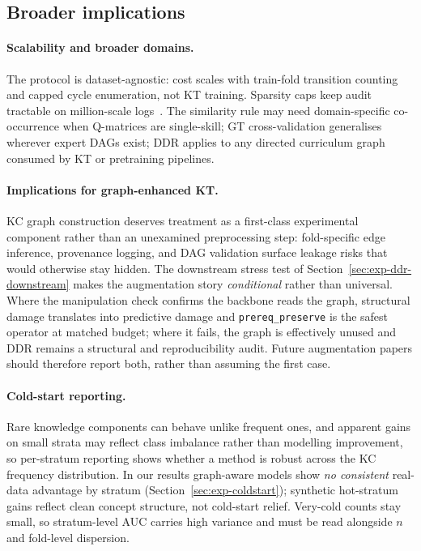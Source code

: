 \documentclass[preprint,10pt,doubleblind]{elsarticle}
\newcommand{\KCs}{knowledge components}
\newcommand{\DDR}{\textsc{DDR}}
\begin{document}
\subsection{Broader implications}
\label{sec:disc-implications}

\paragraph{Scalability and broader domains.}
The protocol is dataset-agnostic: cost scales with train-fold transition
counting and capped cycle enumeration, not KT training. Sparsity caps keep
audit tractable on million-scale logs~\cite{choi2020ednet}. The similarity
rule may need domain-specific co-occurrence when Q-matrices are single-skill;
GT cross-validation generalises wherever expert DAGs exist; \DDR{} applies to
any directed curriculum graph consumed by KT or pretraining pipelines.

\paragraph{Implications for graph-enhanced KT.}
KC graph construction deserves treatment as a first-class experimental
component rather than an unexamined preprocessing step: fold-specific edge
inference, provenance logging, and DAG validation surface leakage risks that
would otherwise stay hidden. The downstream stress test of
Section~\ref{sec:exp-ddr-downstream} makes the augmentation story
\emph{conditional} rather than universal. Where the manipulation check confirms
the backbone reads the graph, structural damage translates into predictive
damage and \texttt{prereq\_preserve} is the safest operator at matched budget;
where it fails, the graph is effectively unused and \DDR{} remains a
structural and reproducibility audit. Future augmentation papers should
therefore report both, rather than assuming the first case.

\paragraph{Cold-start reporting.}
Rare \KCs{} can behave unlike frequent ones, and apparent gains on small strata
may reflect class imbalance rather than modelling improvement, so per-stratum
reporting shows whether a method is robust across the KC frequency
distribution. In our results graph-aware models show \emph{no consistent}
real-data advantage by stratum (Section~\ref{sec:exp-coldstart}); synthetic
hot-stratum gains reflect clean concept structure, not cold-start relief.
Very-cold counts stay small, so stratum-level AUC carries high variance and
must be read alongside $n$ and fold-level dispersion.
\end{document}
